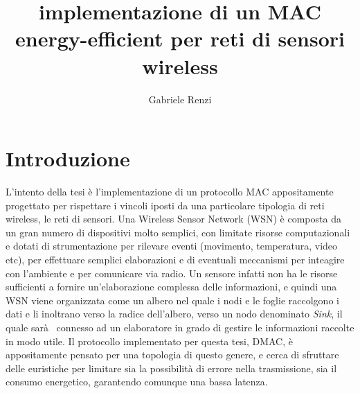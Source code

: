 \documentclass[pdftex,12pt,a4paper,italian,openany]{book}
\title{implementazione di un MAC energy-efficient per reti di sensori wireless}
\author{Gabriele Renzi}
\begin{document}
\newlength{\centeroffset}
\setlength{\centeroffset}{-0.5\oddsidemargin}
\addtolength{\centeroffset}{0.5\evensidemargin}
\thispagestyle{empty}
\noindent\hspace*{\centeroffset}


\chapter{Introduzione}
L'intento della tesi è l'implementazione di un protocollo MAC appositamente progettato per rispettare i vincoli iposti da una particolare tipologia di reti wireless, le reti di sensori.
Una Wireless Sensor Network (WSN) è composta da un gran numero di dispositivi molto semplici, con limitate risorse computazionali e dotati di strumentazione per rilevare eventi (movimento, temperatura, video etc), per effettuare semplici elaborazioni e di eventuali meccanismi per inteagire con l'ambiente e per comunicare via radio. 
Un sensore infatti non ha le risorse sufficienti a fornire un'elaborazione complessa delle 
informazioni, e quindi una WSN viene organizzata come un albero nel quale i nodi e le foglie 
raccolgono i dati e li inoltrano verso la radice dell'albero, verso un nodo denominato 
\emph{Sink}, il quale sarà  connesso ad un elaboratore in grado di gestire le informazioni 
raccolte in modo utile.
Il protocollo implementato per questa tesi, DMAC, è appositamente pensato per una topologia di questo genere, e cerca di sfruttare delle euristiche per limitare sia la possibilità di errore 
nella trasmissione, sia il consumo energetico, garantendo comunque una bassa latenza.

\tableofcontents
\end{document}
